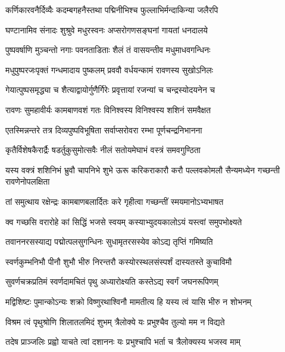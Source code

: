 \twolineshloka
{कर्णिकारवनैर्दिव्यैः कदम्बगहनैस्तथा}
{पद्मिनीभिश्च फुल्लाभिर्मन्दाकिन्या जलैरपि} %

\twolineshloka
{घण्टानामिव संनादः शुश्रुवे मधुरस्वनः}
{अप्सरोगणसङ्घनां गायतां धनदालये} %

\twolineshloka
{पुष्पवर्षाणि मुञ्चन्तो नगाः पवनताडिताः}
{शैलं तं वासयन्तीव मधुमाधवगन्धिनः} %

\twolineshloka
{मधुपुष्परजःपृक्तं गन्धमादाय पुष्कलम्}
{प्रववौ वर्धयन्कामं रावणस्य सुखोऽनिलः} %

\twolineshloka
{गेयात्पुष्पसमृद्ध्या च शैत्याद्वायोर्गुणैर्गिरेः}
{प्रवृत्तायां रजन्यां च चन्द्रस्योदयनेन च} %

\twolineshloka
{रावणः सुमहावीर्यः कामबाणवशं गतः}
{विनिश्वस्य विनिश्वस्य शशिनं समवैक्षत} %

\twolineshloka
{एतस्मिन्नन्तरे तत्र दिव्यपुष्पविभूषिता}
{सर्वाप्सरोवरा रम्भा पूर्णचन्द्रनिभानना} %

\twolineshloka
{कृतैर्विशेषकैरार्द्रैः षडर्तुकुसुमोत्सवैः}
{नीलं सतोयमेघाभं वस्त्रं समवगुण्ठिता} %

\threelineshloka
{यस्य वक्त्रं शशिनिभं भ्रुवौ चापनिभे शुभे}
{ऊरू करिकराकारौ करौ पल्लवकोमलौ}
{सैन्यमध्येन गच्छन्ती रावणेनोपलक्षिता} %

\twolineshloka
{तां समुत्थाय रक्षेन्द्रः कामबाणबलार्दितः}
{करे गृहीत्वा गच्छन्तीं स्मयमानोऽभ्यभाषत} %

\twolineshloka
{क्व गच्छसि वरारोहे कां सिद्धिं भजसे स्वयम्}
{कस्याभ्युदयकालोऽयं यस्त्वां समुपभोक्ष्यते} %

\twolineshloka
{तवाननरसस्याद्य पद्मोत्पलसुगन्धिनः}
{सुधामृतरसस्येव कोऽद्य तृप्तिं गमिष्यति} %

\twolineshloka
{स्वर्णकुम्भनिभौ पीनौ शुभौ भीरु निरन्तरौ}
{कस्योरस्थलसंस्पर्शं दास्यतस्ते कुचाविमौ} %

\twolineshloka
{सुवर्णचक्रप्रतिमं स्वर्णदामचितं पृथु}
{अध्यारोक्ष्यति कस्तेऽद्य स्वर्गं जघनरूपिणम्} %

\twolineshloka
{मद्विशिष्टः पुमान्कोऽन्यः शक्रो विष्णुरथाश्विनौ}
{मामतीत्य हि यस्य त्वं यासि भीरु न शोभनम्} %

\twolineshloka
{विश्रम त्वं पृथुश्रोणि शिलातलमिदं शुभम्}
{त्रैलोक्ये यः प्रभुश्चैव तुल्यो मम न विद्यते} %

\twolineshloka
{तदेष प्राञ्जलिः प्रह्वो याचते त्वां दशाननः}
{यः प्रभुश्चापि भर्ता च त्रैलोक्यस्य भजस्व माम्} %

